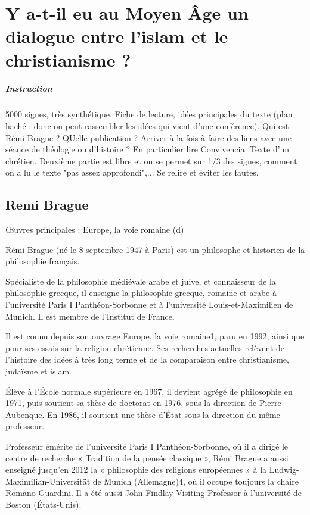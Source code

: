 \chapter{Y a-t-il eu au Moyen Âge un dialogue
entre l’islam et le christianisme ?}


\paragraph{Instruction} 5000 signes, très synthétique. Fiche de lecture, idées principales du texte (plan haché : donc on peut rassembler les idées qui vient d'une conférence). Qui est Rémi Brague ? QUelle publication ? Arriver à la fois à faire des liens avec une séance de théologie ou d'histoire ?  En particulier lire Convivencia. Texte d'un chrétien. Deuxième partie est libre et on se permet sur 1/3 des signes, comment on a lu le texte "pas assez approfondi",... Se relire et éviter les fautes. 

\section{Remi Brague}
 
Œuvres principales : Europe, la voie romaine (d)
 

Rémi Brague (né le 8 septembre 1947 à Paris) est un philosophe et historien de la philosophie français.

Spécialiste de la philosophie médiévale arabe et juive, et connaisseur de la philosophie grecque, il enseigne la philosophie grecque, romaine et arabe à l'université Paris I Panthéon-Sorbonne et à l'université Louis-et-Maximilien de Munich. Il est membre de l'Institut de France.

Il est connu depuis son ouvrage Europe, la voie romaine1, paru en 1992, ainsi que pour ses essais sur la religion chrétienne. Ses recherches actuelles relèvent de l'histoire des idées à très long terme et de la comparaison entre christianisme, judaïsme et islam.

 
Élève à l'École normale supérieure en 1967, il devient agrégé de philosophie en 1971, puis soutient sa thèse de doctorat en 1976, sous la direction de Pierre Aubenque. En 1986, il soutient une thèse d'État sous la direction du même professeur.

Professeur émérite de l'université Paris I Panthéon-Sorbonne, où il a dirigé le centre de recherche « Tradition de la pensée classique », Rémi Brague a aussi enseigné jusqu'en 2012 la « philosophie des religions européennes » à la Ludwig-Maximilian-Universität de Munich (Allemagne)4, où il occupe toujours la chaire Romano Guardini. Il a été aussi John Findlay Visiting Professor à l'université de Boston (États-Unis).

